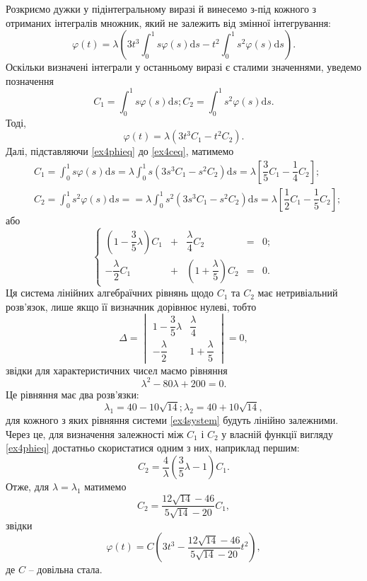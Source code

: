 \documentclass[14pt,twoside]{extreport}
\theoremstyle{mystyle}
\numberwithin{equation}{chapter}
\begin{document}
\begin{small}
Розкриємо дужки у підінтегральному виразі й винесемо з-під кожного з отриманих інтегралів множник, який не залежить від змінної інтегрування:
\[
\varphi(t) = \lambda \left(3t^3\int_{0}^{1} s \varphi(s) \mathrm{d}s - t^2 \int_{0}^{1} s^2 \varphi(s) \mathrm{d}s\right).
\]
Оскільки визначені інтеграли у останньому виразі є сталими значеннями, уведемо позначення
\begin{equation}\label{ex4ceq}
C_1 = \int_{0}^{1} s \varphi(s) \mathrm{d}s; C_2 = \int_{0}^{1} s^2 \varphi(s) \mathrm{d}s.
\end{equation}
Тоді,
\begin{equation}\label{ex4phieq}
\varphi(t) = \lambda \left(3t^3 C_1 - t^2 C_2\right).
\end{equation}
Далі, підставляючи \eqref{ex4phieq} до \eqref{ex4ceq}, матимемо
\begin{align*}
&C_1 = \int_{0}^{1} s \varphi(s) \mathrm{d}s = \lambda \int_{0}^{1} s \left(3s^3 C_1 - s^2 C_2\right) \mathrm{d}s = \lambda\left[\dfrac{3}{5}C_1 - \dfrac{1}{4}C_2\right];\\
&C_2 = \int_{0}^{1} s^2 \varphi(s) \mathrm{d}s = = \lambda \int_{0}^{1} s^2 \left(3s^3 C_1 - s^2 C_2\right) \mathrm{d}s = \lambda\left[\dfrac{1}{2}C_1 - \dfrac{1}{5}C_2\right];
\end{align*}
або
\begin{equation}\label{ex4system}
\left\{
\begin{array}{ccccc}
\left(1-\dfrac{3}{5}\lambda\right) C_1 &+& \dfrac{\lambda}{4} C_2 &=& 0;\\
-\dfrac{\lambda}{2} C_1 &+& \left(1+\dfrac{\lambda}{5}\right) C_2 &=& 0.
\end{array}
\right.
\end{equation}
Ця система лінійних алгебраїчних рівнянь щодо $C_1$ та $C_2$ має нетривіальний розв'язок, лише якщо її визначник дорівнює нулеві, тобто
\[
\Delta = 
\begin{vmatrix}
1-\dfrac{3}{5}\lambda & \dfrac{\lambda}{4}\\
-\dfrac{\lambda}{2} & 1+\dfrac{\lambda}{5}
\end{vmatrix}
=0,
\]
звідки для характеристичних чисел маємо рівняння
\[
\lambda^2 - 80 \lambda + 200=0.
\]
Це рівняння має два розв'язки:
\[
\lambda_1= 40 - 10\sqrt{14}; \lambda_2 = 40+10\sqrt{14},
\]
для кожного з яких рівняння системи \eqref{ex4system} будуть лінійно залежними. Через це, для визначення залежності між $C_1$ і $C_2$ у власній функції вигляду \eqref{ex4phieq} достатньо скористатися одним з них, наприклад першим:
\[
C_2 = \dfrac{4}{\lambda} \left(\dfrac{3}{5}\lambda -1\right)C_1.
\]
Отже, для $\lambda = \lambda_1$ матимемо
\[
C_2 = \dfrac{12\sqrt{14} - 46}{5\sqrt{14} - 20}C_1,
\]
звідки
\[
\varphi(t) = C \left(3t^3 - \dfrac{12\sqrt{14} - 46}{5\sqrt{14} - 20} t^2\right),
\]
де $C$ -- довільна стала.


\end{small}
\end{document}
